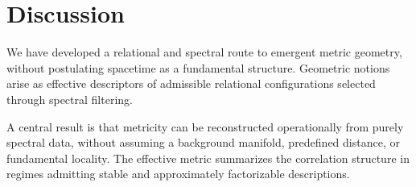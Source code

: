 \section{Discussion}
  \label{sec:discussion}

  We have developed a relational and spectral route to emergent metric geometry,
  without postulating spacetime as a fundamental structure.
  Geometric notions arise as effective descriptors of admissible relational
  configurations selected through spectral filtering.

  A central result is that metricity can be reconstructed operationally from
  purely spectral data, without assuming a background manifold,
  predefined distance, or fundamental locality.
  The effective metric summarizes the correlation structure
  in regimes admitting stable and approximately factorizable descriptions.

  
  
  
  
  
  
  
